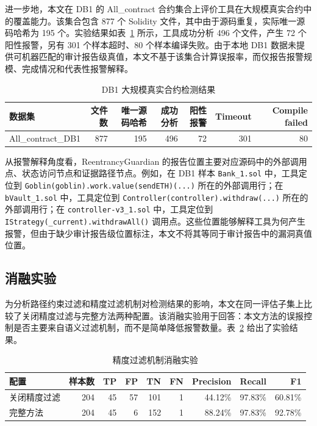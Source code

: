 进一步地，本文在 DB1 的 All\_contract 合约集合上评价工具在大规模真实合约中的覆盖能力。该集合包含 877 个 Solidity 文件，其中由于源码重复，实际唯一源码哈希为 195 个。实验结果如表~\ref{tab:db1-scale-result} 所示，工具成功分析 496 个文件，产生 72 个阳性报警，另有 301 个样本超时、80 个样本编译失败。由于本地 DB1 数据未提供可机器匹配的审计报告级真值，本文不基于该集合计算误报率，而仅报告报警规模、完成情况和代表性报警解释。

\begin{table}[htbp]
\centering
\caption{DB1 大规模真实合约检测结果}
\label{tab:db1-scale-result}
\begin{tabular}{lrrrrrr}
\toprule
数据集 & 文件数 & 唯一源码哈希 & 成功分析 & 阳性报警 & Timeout & Compile failed \\
\midrule
All\_contract\_DB1 & 877 & 195 & 496 & 72 & 301 & 80 \\
\bottomrule
\end{tabular}
\end{table}

从报警解释角度看，ReentrancyGuardian 的报告位置主要对应源码中的外部调用点、状态访问节点和证据路径节点。例如，在 DB1 样本 \texttt{Bank\_1.sol} 中，工具定位到 \texttt{Goblin(goblin).work.value(sendETH)(...)} 所在的外部调用行；在 \texttt{bVault\_1.sol} 中，工具定位到 \texttt{Controller(controller).withdraw(...)} 所在的外部调用行；在 \texttt{controller-v3\_1.sol} 中，工具定位到 \texttt{IStrategy(\_current).withdrawAll()} 调用点。这些位置能够解释工具为何产生报警，但由于缺少审计报告级位置标注，本文不将其等同于审计报告中的漏洞真值位置。

\subsection{消融实验}

为分析路径约束过滤和精度过滤机制对检测结果的影响，本文在同一评估子集上比较了关闭精度过滤与完整方法两种配置。该消融实验用于回答：本文方法的误报控制是否主要来自语义过滤机制，而不是简单降低报警数量。表~\ref{tab:precision-filter-ablation} 给出了实验结果。

\begin{table}[htbp]
\centering
\caption{精度过滤机制消融实验}
\label{tab:precision-filter-ablation}
\begin{tabular}{lrrrrrrrr}
\toprule
配置 & 样本数 & TP & FP & TN & FN & Precision & Recall & F1 \\
\midrule
关闭精度过滤 & 204 & 45 & 57 & 101 & 1 & 44.12\% & 97.83\% & 60.81\% \\
完整方法 & 204 & 45 & 6 & 152 & 1 & 88.24\% & 97.83\% & 92.78\% \\
\bottomrule
\end{tabular}
\end{table}

